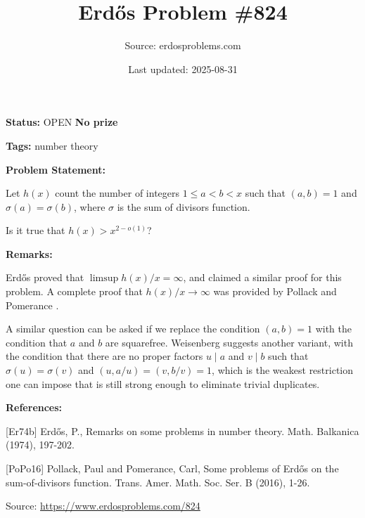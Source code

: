 \documentclass{article}
\title{Erd\H{o}s Problem \#824}
\date{Last updated: 2025-08-31}
\author{Source: erdosproblems.com}
\begin{document}
\maketitle

\noindent\textbf{Status:} OPEN \quad \textbf{No prize}

\noindent\textbf{Tags:} number theory

\medskip
\noindent\textbf{Problem Statement:}

Let $h(x)$ count the number of integers $1\leq a<b<x$ such that $(a,b)=1$ and $\sigma(a)=\sigma(b)$, where $\sigma$ is the sum of divisors function.

Is it true that $h(x)>x^{2-o(1)}$?

\bigskip
\noindent\textbf{Remarks:}

Erd\H{o}s \cite{Er74b} proved that $\limsup h(x)/x= \infty$, and claimed a similar proof for this problem. A complete proof that $h(x)/x\to \infty$ was provided by Pollack and Pomerance \cite{PoPo16}.

A similar question can be asked if we replace the condition $(a,b)=1$ with the condition that $a$ and $b$ are squarefree. Weisenberg suggests another variant, with the condition that there are no proper factors $u\mid a$ and $v\mid b$ such that $\sigma(u)=\sigma(v)$ and $(u,a/u)=(v,b/v)=1$, which is the weakest restriction one can impose that is still strong enough to eliminate trivial duplicates.

\bigskip
\noindent\textbf{References:}

[Er74b] Erd\H{o}s, P., Remarks on some problems in number theory. Math. Balkanica (1974), 197-202.
 
 [PoPo16] Pollack, Paul and Pomerance, Carl, Some problems of Erd\H{o}s on the sum-of-divisors function. Trans. Amer. Math. Soc. Ser. B (2016), 1-26.

\bigskip
\noindent\small{Source: \url{https://www.erdosproblems.com/824}}
\end{document}
